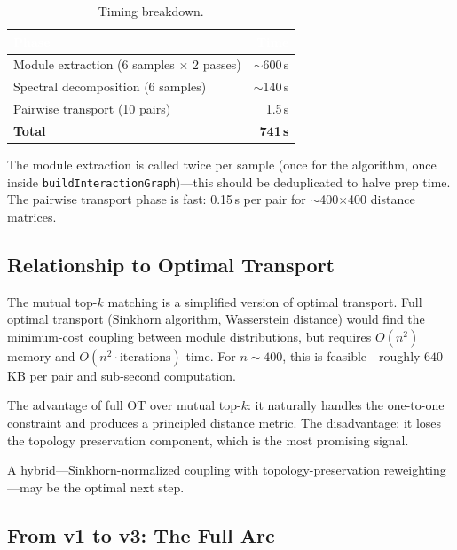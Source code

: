 \documentclass{../yalumba}
\begin{document}
\begin{table}[H]
  \centering
  \tablestyle
  \caption{Timing breakdown.}
  \label{tab:timing}
  \begin{tabular}{lr}
    \toprule
    \rowcolor{table-header}
    \textcolor{white}{\textbf{Phase}} &
    \textcolor{white}{\textbf{Time}} \\
    \midrule
    Module extraction (6 samples $\times$ 2 passes) & $\sim$600\,s \\
    Spectral decomposition (6 samples) & $\sim$140\,s \\
    Pairwise transport (10 pairs) & 1.5\,s \\
    \midrule
    \textbf{Total} & \textbf{741\,s} \\
    \bottomrule
  \end{tabular}
\end{table}

The module extraction is called twice per sample (once for the algorithm,
once inside \texttt{buildInteractionGraph})---this should be deduplicated to
halve prep time.  The pairwise transport phase is fast: 0.15\,s per pair for
$\sim$400$\times$400 distance matrices.

\subsection{Relationship to Optimal Transport}

The mutual top-$k$ matching is a simplified version of optimal transport.
Full optimal transport (Sinkhorn algorithm, Wasserstein distance) would find
the minimum-cost coupling between module distributions, but requires $O(n^2)$
memory and $O(n^2 \cdot \text{iterations})$ time.  For $n \sim 400$, this is
feasible---roughly $640$\,KB per pair and sub-second computation.

The advantage of full OT over mutual top-$k$: it naturally handles the
one-to-one constraint and produces a principled distance metric.  The
disadvantage: it loses the topology preservation component, which is the
most promising signal.

A hybrid---Sinkhorn-normalized coupling with topology-preservation
reweighting---may be the optimal next step.

\subsection{From v1 to v3: The Full Arc}
\end{document}
